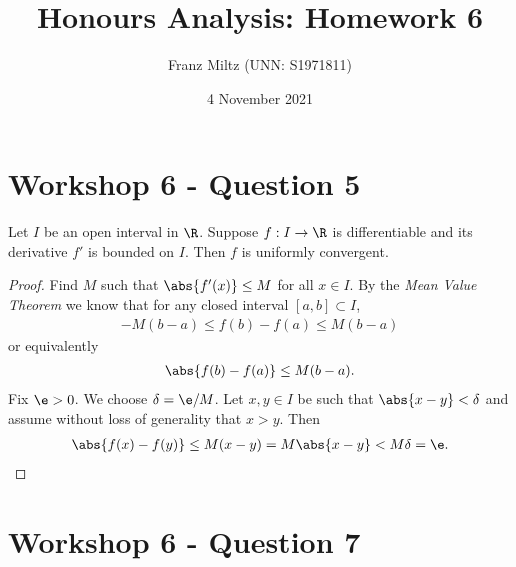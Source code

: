 \documentclass{article}
\begin{document}
\title{Honours Analysis: Homework 6}
\author{Franz Miltz (UNN: S1971811)}
\date{4 November 2021}
\maketitle

\section*{Workshop 6 - Question 5}
\begin{claim*}
   Let $I$ be an open interval in $\R$. Suppose $f:I\to\R$ is differentiable
   and its derivative $f'$ is bounded on $I$. Then $f$ is uniformly convergent.
\end{claim*}
\begin{proof}
   Find $M$ such that $\abs{f'(x)} \leq M$ for all $x\in I$. By the 
   \emph{Mean Value Theorem} we know that for any closed interval $[a,b]\subset I$,
   \begin{align*}
      -M(b-a) \leq f(b) - f(a) \leq M(b-a)
   \end{align*}
   or equivalently 
   \begin{align*}
      \abs{f(b)-f(a)} \leq M(b-a).
   \end{align*}
   Fix $\e>0$. We choose $\delta = \e/M$. Let $x,y\in I$ be such that $\abs{x-y}<\delta$ 
   and assume without loss of generality that $x>y$. Then
   \begin{align*}
      \abs{f(x) - f(y)} \leq M(x-y) = M\abs{x-y} < M\delta = \e.
   \end{align*}
\end{proof}

\section*{Workshop 6 - Question 7}
\end{document}
